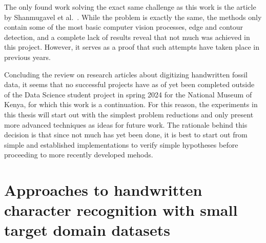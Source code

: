 \documentclass[english,twoside,openright]{UH_DS_MSc}
\begin{document}
The only found work solving the exact same challenge as this work is the article by Shanmugavel et al.~\cite{shanmugavelHandwrittenOpticalCharacter2018}.
While the problem is exactly the same, the methods only contain some of the most basic computer 
vision processes, edge and contour detection, and a complete lack of results reveal that not much was achieved in 
this project. However, it serves as a proof that such attempts have taken place in previous years.

Concluding the review on research articles about digitizing handwritten fossil data, it seems that no successful projects
have as of yet been completed outside of the Data Science student project in spring 2024 for the National 
Museum of Kenya, for which this work is a continuation. For this reason, the experiments in this thesis will 
start out with the simplest problem reductions and only present more advanced techniques as ideas for future work.
The rationale behind this decision is that since not much has yet been done, it is best to start out from 
simple and established implementations to verify simple hypotheses before proceeding to more recently developed mehods.

\section{Approaches to handwritten character recognition with small target domain datasets}
\label{sect:same_solution}

\end{document}
